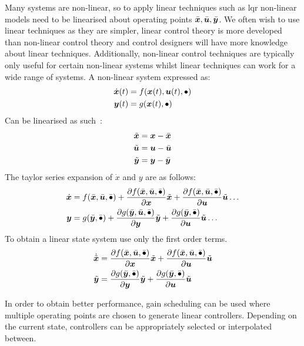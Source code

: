 Many systems are non-linear, so to apply linear techniques such as \gls{lqr} non-linear models need to be linearised about operating points $\bar{\bm x}, \bar{\bm u}, \bar{\bm y}$. 
We often wish to use linear techniques as they are simpler, linear control theory is more developed than non-linear control theory and control designers will have more knowledge about linear techniques.
Additionally, non-linear control techniques are typically only useful for certain non-linear systems whilst linear techniques can work for a wide range of systems.
A non-linear system expressed as:
\begin{align}
    \dot{\bm x}(t) &= f(\bm x(t), \bm u(t), \bullet) \\
    \bm y(t) &= g(\bm x(t), \bullet)
\end{align}
Can be linearised as such~\cite{Bla2010}:
\begin{align}
    \tilde{\bm x} &= \bm x - \bar{\bm x} \\
    \tilde{\bm u} &= \bm u - \bar{\bm u} \\
    \tilde{\bm y} &= \bm y - \bar{\bm y}
\end{align}
The taylor series expansion of $\dot{x}$ and $y$ are as follows:
\begin{align}
    \dot{\bm x} &= f(\bar{\bm x}, \bar{\bm u}, \bar{\bullet}) + \frac{\partial f(\bar{\bm x}, \bar{\bm u}, \bar{\bullet})}{\partial \bm x} \tilde{\bm x} + \frac{\partial f(\bar{\bm x}, \bar{\bm u}, \bar{\bullet})}{\partial \bm u} \tilde{\bm u} \dots \\
    \bm y &= g(\bar{\bm y}, \bar{\bullet}) + \frac{\partial g(\bar{\bm y}, \bar{\bm u}, \bar{\bullet})}{\partial \bm y} \tilde{\bm y} + \frac{\partial g(\bar{\bm y}, \bar{\bullet})}{\partial \bm u} \tilde{\bm u} \dots
\end{align}
To obtain a linear state system use only the first order terms.
\begin{align}
    \dot{\tilde{\bm x}} &= \frac{\partial f(\bar{\bm x}, \bar{\bm u}, \bar{\bullet})}{\partial \bm x} \tilde{\bm x} + \frac{\partial f(\bar{\bm x}, \bar{\bm u}, \bar{\bullet})}{\partial \bm u} \tilde{\bm u} \\
    \tilde{\bm y} &= \frac{\partial g(\bar{\bm y}, \bar{\bullet})}{\partial \bm y} \tilde{\bm y} + \frac{\partial g(\bar{\bm y}, \bar{\bullet})}{\partial \bm u} \tilde{\bm u}
\end{align}

In order to obtain better performance, gain scheduling can be used where multiple operating points are chosen to generate linear controllers.
Depending on the current state, controllers can be appropriately selected or interpolated between.

